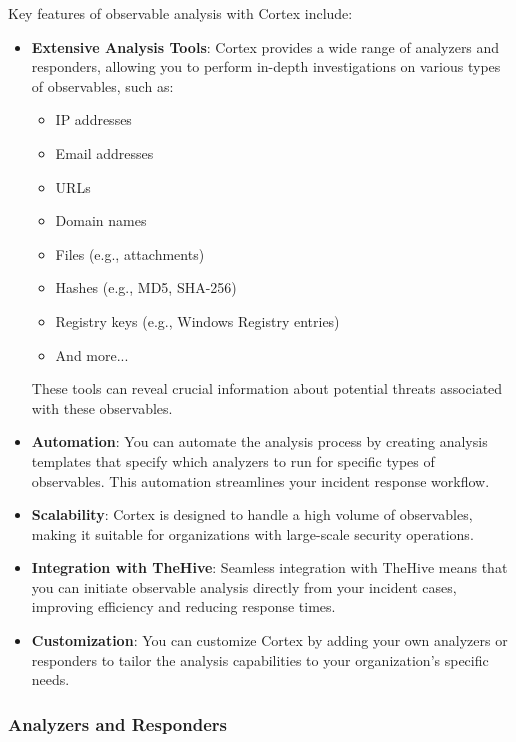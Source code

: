 \documentclass{article}
\begin{document}
Key features of observable analysis with Cortex include:

\begin{itemize}
  \item \textbf{Extensive Analysis Tools}:
  Cortex provides a wide range of analyzers and responders, allowing you to perform in-depth investigations on various types of observables, such as:
    \begin{itemize}
        \item IP addresses
        \item Email addresses
        \item URLs
        \item Domain names
        \item Files (e.g., attachments)
        \item Hashes (e.g., MD5, SHA-256)
        \item Registry keys (e.g., Windows Registry entries)
        \item And more...
    \end{itemize}
    These tools can reveal crucial information about potential threats associated with these observables.
  
  \item \textbf{Automation}:
  You can automate the analysis process by creating analysis templates that specify which analyzers to run for specific types of observables. This automation streamlines your incident response workflow.
  
  \item \textbf{Scalability}: 
  Cortex is designed to handle a high volume of observables, making it suitable for organizations with large-scale security operations.
  
  \item \textbf{Integration with TheHive}:
  Seamless integration with TheHive means that you can initiate observable analysis directly from your incident cases, improving efficiency and reducing response times.
  
  \item \textbf{Customization}: 
  You can customize Cortex by adding your own analyzers or responders to tailor the analysis capabilities to your organization's specific needs.
\end{itemize}

\subsubsection{Analyzers and Responders}
\end{document}

